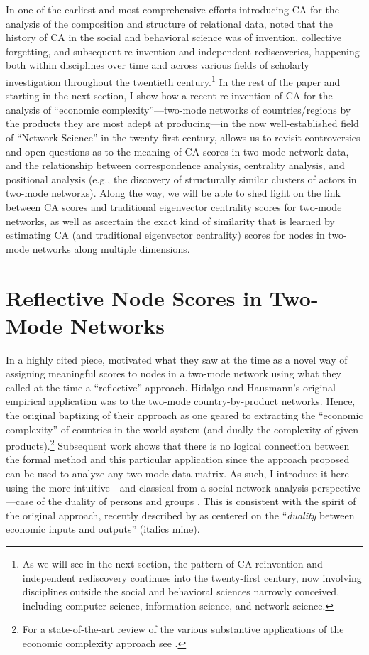\documentclass[a4paper,fleqn]{cas-sc}
\begin{document}
In one of the earliest and most comprehensive efforts introducing CA for the analysis of the composition and structure of relational data, \citet[19-21]{wasserman1990correspondence} noted that the history of CA in the social and behavioral science was of invention, collective forgetting, and subsequent re-invention and independent rediscoveries, happening both within disciplines over time and across various fields of scholarly investigation throughout the twentieth century.\footnote{As we will see in the next section, the pattern of CA reinvention and independent rediscovery continues into the twenty-first century, now involving disciplines outside the social and behavioral sciences narrowly conceived, including computer science, information science, and network science.} In the rest of the paper and starting in the next section, I show how a recent re-invention of CA for the analysis of ``economic complexity''---two-mode networks of countries/regions by the products they are most adept at producing---in the now well-established field of ``Network Science'' in the twenty-first century, allows us to revisit controversies and open questions as to the meaning of CA scores in two-mode network data, and the relationship between correspondence analysis, centrality analysis, and positional analysis (e.g., the discovery of structurally similar clusters of actors in two-mode networks). Along the way, we will be able to shed light on the link between CA scores and traditional eigenvector centrality scores for two-mode networks, as well as ascertain the exact kind of similarity that is learned by estimating CA (and traditional eigenvector centrality) scores for nodes in two-mode networks along multiple dimensions. 

\section{Reflective Node Scores in Two-Mode Networks} \label{sec:ref2mode}
In a highly cited piece, \citet{hidalgo2009building} motivated what they saw at the time as a novel way of assigning meaningful scores to nodes in a two-mode network using what they called at the time a ``reflective'' approach. Hidalgo and Hausmann's original empirical application was to the two-mode country-by-product networks. Hence, the original baptizing of their approach as one geared to extracting the ``economic complexity'' of countries in the world system (and dually the complexity of given products).\footnote{For a state-of-the-art review of the various substantive applications of the economic complexity approach see \citet{hidalgo2021economic}.} Subsequent work shows that there is no logical connection between the formal method and this particular application since the approach proposed can be used to analyze any two-mode data matrix. As such, I introduce it here using the more intuitive---and classical from a social network analysis perspective---case of the duality of persons and groups \citep{breiger1974duality}. This is consistent with the spirit of the original approach, recently described by \citet[92]{hidalgo2021economic} as centered on the ``\textit{duality} between economic inputs and outputs'' (italics mine).
\end{document}
